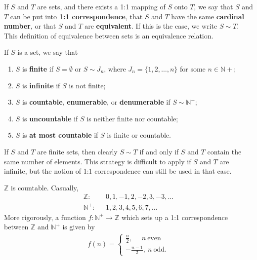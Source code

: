 \documentclass[12pt]{article}
\begin{document}
\begin{defn}
  If $S$ and $T$ are sets, and there exists a 1:1 mapping of $S$ onto $T$, we say
  that $S$ and $T$ can be put into \textbf{1:1 correspondence}, that $S$ and $T$ have
  the same \textbf{cardinal number}, or that $S$ and $T$ are \textbf{equivalent}. If
  this is the case, we write $S \sim T$. This definition of equivalence between sets
  is an equivalence relation.
\end{defn}

\begin{defn}
  If $S$ is a set, we say that
  \begin{enumerate}
    \item
      $S$ is \textbf{finite} if $S = \emptyset$ or $S \sim J_n$, where $J_n =
      \{1,2,\ldots,n\}$ for some $n \in \mathbb{N}+$;
    \item
      $S$ is \textbf{infinite} if $S$ is not finite;
    \item
      $S$ is \textbf{countable}, \textbf{enumerable}, or \textbf{denumerable} if $S
      \sim \mathbb{N}^+$;
    \item
      $S$ is \textbf{uncountable} if $S$ is neither finite nor countable;
    \item
      $S$ is \textbf{at most countable} if $S$ is finite or countable.
  \end{enumerate}
\end{defn}

\begin{comm}
  If $S$ and $T$ are finite sets, then clearly $S \sim T$ if and only if $S$ and $T$
  contain the same number of elements. This strategy is difficult to apply if $S$ and
  $T$ are infinite, but the notion of 1:1 correspondence can still be used in that
  case.
\end{comm}

\begin{exm}
  $\mathbb{Z}$ is countable. Casually,
  \begin{align*}
    \mathbb{Z}:&\ \ \ 0,1,-1,2,-2,3,-3,\ldots\\
    \mathbb{N}^+:&\ \ \ 1,2,3,4,5,6,7,\ldots
  \end{align*}
  More rigorously, a function $f: \mathbb{N}^+ \to \mathbb{Z}$ which sets up a 1:1
  correspondence between $\mathbb{Z}$ and $\mathbb{N}^+$ is given by
  \begin{align*}
    f(n) =
    \begin{cases}
      \frac{n}{2},\ \ \ \ \ \ n\ \text{even}\\
      -\frac{n-1}{2},\ n\ \text{odd}.
    \end{cases}
  \end{align*}
\end{exm}
\end{document}
